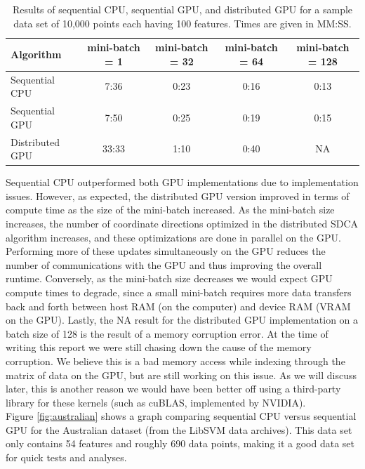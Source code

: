 \documentclass{article}
\begin{document}
\begin{table}
  \centering
  \caption{Results of sequential CPU, sequential GPU, and distributed GPU
    for a sample data set of 10,000 points each having 100 features. Times are
    given in MM:SS.}
  \label{tab:res-scale}
  \begin{tabular}{l|cccc}
      \textbf{Algorithm} & \textbf{mini-batch = 1} & \textbf{mini-batch = 32} &
      \textbf{mini-batch = 64} & \textbf{mini-batch = 128}\\\hline
      Sequential CPU & 7:36 & 0:23 & 0:16 & 0:13\\
      Sequential GPU & 7:50 & 0:25 & 0:19 & 0:15\\
      Distributed GPU & 33:33 & 1:10 & 0:40 & NA\\\hline
  \end{tabular}
\end{table}

Sequential CPU outperformed both GPU implementations due to implementation
issues. However, as expected, the distributed GPU version improved in terms of
compute time as the size of the mini-batch increased. As the mini-batch size
increases, the number of coordinate directions optimized in the distributed
SDCA algorithm increases, and these optimizations are done in parallel on the
GPU. Performing more of these updates simultaneously on the GPU reduces the
number of communications with the GPU and thus improving  the overall runtime.
Conversely, as the mini-batch size decreases we would expect GPU compute times
to degrade, since a small mini-batch requires more data transfers back and
forth between host RAM (on the computer) and device RAM (VRAM on the
GPU). Lastly, the NA result for the distributed GPU implementation on a batch
size of 128 is the result of a memory corruption error. At the time of writing
this report we were still chasing down the cause of the memory corruption. We
believe this is a bad memory access while indexing through the matrix of data on
the GPU, but are still working on this issue. As we will discuss later, this is
another reason we would have been better off using a third-party library for
these kernels (such as cuBLAS, implemented by NVIDIA).\\

Figure \ref{fig:australian} shows a graph comparing sequential CPU versus
sequential GPU for the Australian dataset (from the LibSVM data archives). This
data set only contains 54 features and roughly 690 data points, making it a good
data set for quick tests and analyses.
\end{document}
